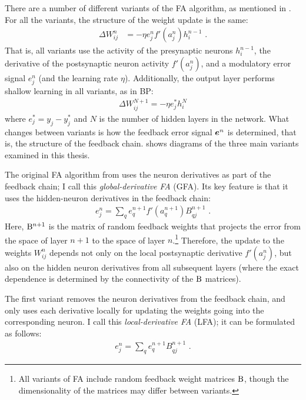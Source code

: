 There are a number of different variants of the FA algorithm,
as mentioned in .
For all the variants, the structure of the weight update is the same:
\begin{align}
  \Delta W^n_{ij} &= -\eta e_j^n f'(a_j^n) h_i^{n-1} \text{ .}
\end{align}
That is, all variants use the activity of the presynaptic neurons $h_i^{n-1}$,
the derivative of the postsynaptic neuron activity $f'(a_j^n)$,
and a modulatory error signal $e_j^n$ (and the learning rate $\eta$).
Additionally, the output layer performs shallow learning in all variants,
as in BP:
\begin{align}
  \Delta W^{N+1}_{ij} = -\eta e^*_j h_i^N
\end{align}
where $e^*_j = y_j - y^*_j$ and $N$ is the number of hidden layers in the network.
What changes between variants is how the feedback error signal $\boldsymbol{e}^n$
is determined,
that is, the structure of the feedback chain.
 shows diagrams of the three main variants
examined in this thesis.

The original FA algorithm from \textcite{Lillicrap2014}
uses the neuron derivatives as part of the feedback chain;
I call this \emph{global-derivative FA} (GFA).
Its key feature is that it uses the hidden-neuron derivatives in the feedback chain:
\begin{align}
  e^n_j = \sum_q e^{n+1}_q f'(a^{n+1}_q) B^{n+1}_{qj} \text{ .}
\end{align}
Here, $\mathrm{B}^{n+1}$ is the matrix of random feedback weights
that projects the error from the space of layer $n + 1$ to the space of layer $n$.\footnote{
  All variants of FA include random feedback weight matrices $\mathrm{B}$,
  though the dimensionality of the matrices may differ between variants.}
Therefore, the update to the weights $W^n_{ij}$
depends not only on the local postsynaptic derivative $f'(a_j^n)$,
but also on the hidden neuron derivatives from all subsequent layers
(where the exact dependence is determined by the connectivity of the $\mathrm{B}$ matrices).

The first variant removes the neuron derivatives from the feedback chain,
and only uses each derivative locally for updating the weights
going into the corresponding neuron.
I call this \emph{local-derivative FA} (LFA);
it can be formulated as follows:
\begin{align}
  e^n_j = \sum_q e^{n+1}_q B^{n+1}_{qj} \text{ .}
\end{align}

